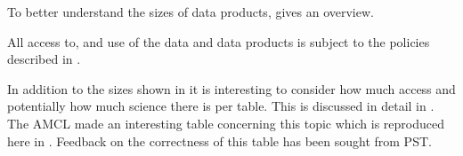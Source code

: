 To better understand the sizes of \RO data products,  gives an overview.



All access to, and use of the \RO data and data products is subject to the policies described in .

In addition to the sizes shown in  it is interesting to consider how much access and potentially how much science
there is per table. This is discussed in detail in . The \gls{AMCL} made an interesting table concerning this topic
which is reproduced here in . Feedback on the correctness of this table has been sought from \gls{PST}.

